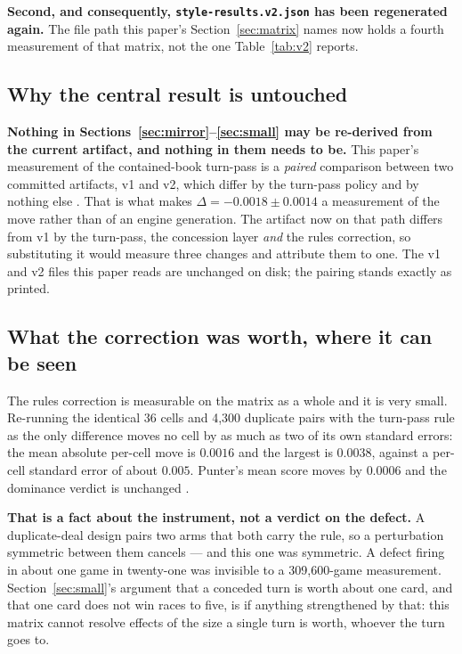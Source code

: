 \documentclass[11pt]{article}
\newcommand{\code}[1]{\texttt{#1}}
\begin{document}
\textbf{Second, and consequently, \code{style-results.v2.json} has been regenerated again.} The
file path this paper's Section~\ref{sec:matrix} names now holds a fourth measurement of that
matrix, not the one Table~\ref{tab:v2} reports.

\subsection{Why the central result is untouched}

\textbf{Nothing in Sections~\ref{sec:mirror}--\ref{sec:small} may be re-derived from the current
artifact, and nothing in them needs to be.} This paper's measurement of the contained-book
turn-pass is a \emph{paired} comparison between two committed artifacts, v1 and v2, which differ
by the turn-pass policy and by nothing else \cite{artifacts}. That is what makes
$\Delta = -0.0018 \pm 0.0014$ a measurement of the move rather than of an engine generation. The
artifact now on that path differs from v1 by the turn-pass, the concession layer \emph{and} the
rules correction, so substituting it would measure three changes and attribute them to one. The
v1 and v2 files this paper reads are unchanged on disk; the pairing stands exactly as printed.

\subsection{What the correction was worth, where it can be seen}

The rules correction is measurable on the matrix as a whole and it is very small. Re-running the
identical 36 cells and 4{,}300 duplicate pairs with the turn-pass rule as the only difference
moves no cell by as much as two of its own standard errors: the mean absolute per-cell move is
$0.0016$ and the largest is $0.0038$, against a per-cell standard error of about $0.005$. Punter's
mean score moves by $0.0006$ and the dominance verdict is unchanged \cite{v05}.

\textbf{That is a fact about the instrument, not a verdict on the defect.} A duplicate-deal design
pairs two arms that both carry the rule, so a perturbation symmetric between them cancels --- and
this one was symmetric. A defect firing in about one game in twenty-one was invisible to a
309{,}600-game measurement. Section~\ref{sec:small}'s argument that a conceded turn is worth about
one card, and that one card does not win races to five, is if anything strengthened by that: this
matrix cannot resolve effects of the size a single turn is worth, whoever the turn goes to.
\end{document}
